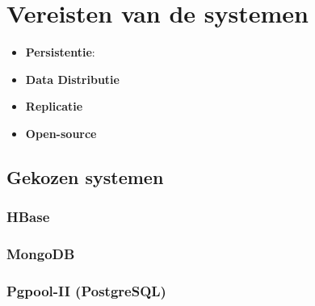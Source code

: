 \section{Vereisten van de systemen}

\begin{itemize}
\item \textbf{Persistentie}: 
\item \textbf{Data Distributie}
\item \textbf{Replicatie}
\item \textbf{Open-source}
\end{itemize}

\subsection{Gekozen systemen}
\subsubsection{HBase}
\subsubsection{MongoDB}
\subsubsection{Pgpool-II (PostgreSQL)}